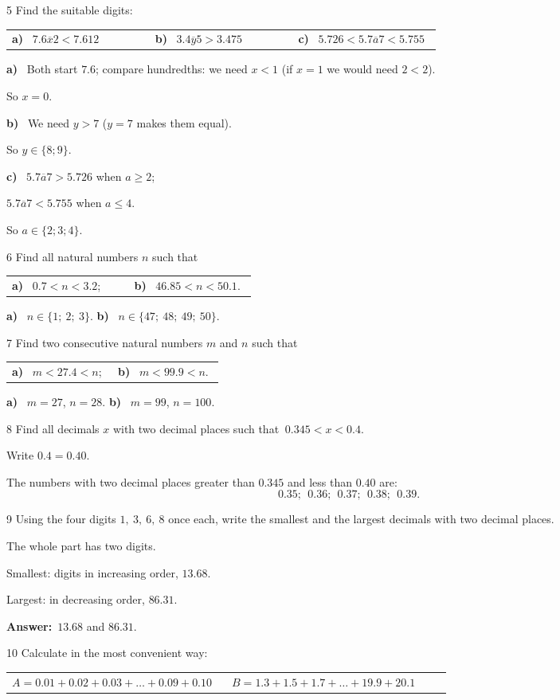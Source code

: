 \documentclass[11pt]{article}
\makeatletter
\newif\ifsol \solfalse
\renewcommand{\arraystretch}{1.35}
\providecommand{\AnsWord}{Đáp số}
\newcommand{\dapso}[1]{\par\textbf{\AnsWord:}\ #1}
\newcommand{\probsol}[1]{%
  \begin{lrbox}{\solmeasure}\begin{minipage}{\dimexpr\linewidth-24pt\relax}#1\end{minipage}\end{lrbox}%
  \ifsol
    \begin{solbox}#1\end{solbox}%
  \else
    \setlength{\solht}{\dimexpr\ht\solmeasure+\dp\solmeasure+0.85cm\relax}%
    \ifdim\solht<1.35cm\setlength{\solht}{1.35cm}\fi
    \begin{tcolorbox}[colback=white,colframe=Line,boxrule=0.8pt,arc=5pt,
      left=8pt,right=8pt,top=4pt,bottom=4pt,height=\solht]{\footnotesize\color{Slate}\itshape\WorkWord}\end{tcolorbox}%
  \fi}
\newcommand{\nd}[1]{\overline{#1}}
\newcommand{\pa}[1]{\textbf{#1)}\ }
\newenvironment{cols2}{\par\vspace{3pt}\noindent\setlength{\tabcolsep}{0pt}\renewcommand{\arraystretch}{1.3}%
  \begin{tabular}{@{}>{\raggedright\arraybackslash\rule{0pt}{4.4ex}}p{0.48\linewidth}<{\rule[-2.3ex]{0pt}{0pt}}@{\hspace{0.03\linewidth}}>{\raggedright\arraybackslash\rule{0pt}{4.4ex}}p{0.48\linewidth}<{\rule[-2.3ex]{0pt}{0pt}}@{}}}%
  {\end{tabular}\par}
\newenvironment{cols3}{\par\vspace{3pt}\noindent\setlength{\tabcolsep}{0pt}\renewcommand{\arraystretch}{1.3}%
  \begin{tabular}{@{}>{\raggedright\arraybackslash\rule{0pt}{4.4ex}}p{0.32\linewidth}<{\rule[-2.3ex]{0pt}{0pt}}@{\hspace{0.015\linewidth}}>{\raggedright\arraybackslash\rule{0pt}{4.4ex}}p{0.32\linewidth}<{\rule[-2.3ex]{0pt}{0pt}}@{\hspace{0.015\linewidth}}>{\raggedright\arraybackslash\rule{0pt}{4.4ex}}p{0.32\linewidth}<{\rule[-2.3ex]{0pt}{0pt}}@{}}}%
  {\end{tabular}\par}
\newcommand{\gap}{\vspace{0.3cm}}
\def\WorkWord{Your work:}
\def\AnsWord{Answer}
\makeatother
\begin{document}
\gap
\begin{probbox}{5}{\relax}
Find the suitable digits:
\begin{cols3}
\pa{a} $7.6\nd{x}2<7.612$ & \pa{b} $3.4\nd{y}5>3.475$ & \pa{c} $5.726<5.7\nd{a}7<5.755$
\end{cols3}
\end{probbox}
\probsol{
\pa{a} Both start $7.6$; compare hundredths: we need $x<1$ (if $x=1$ we would need $2<2$).\par So $x=0$.\par
\pa{b} We need $y>7$ ($y=7$ makes them equal).\par So $y\in\{8;9\}$.\par
\pa{c} $5.7\nd{a}7>5.726$ when $a\ge2$;\par $5.7\nd{a}7<5.755$ when $a\le4$.\par So $a\in\{2;3;4\}$.
}
\gap
\begin{probbox}{6}{\relax}
Find all natural numbers $n$ such that
\begin{cols2}
\pa{a} $0.7<n<3.2$; & \pa{b} $46.85<n<50.1$.
\end{cols2}
\end{probbox}
\probsol{
\pa{a} $n\in\{1;\ 2;\ 3\}$. \qquad \pa{b} $n\in\{47;\ 48;\ 49;\ 50\}$.
}
\gap
\begin{probbox}{7}{\relax}
Find two consecutive natural numbers $m$ and $n$ such that
\begin{cols2}
\pa{a} $m<27.4<n$; & \pa{b} $m<99.9<n$.
\end{cols2}
\end{probbox}
\probsol{
\pa{a} $m=27$, $n=28$. \qquad \pa{b} $m=99$, $n=100$.
}
\gap
\begin{probbox}{8}{\relax}
Find all decimals $x$ with two decimal places such that $\ 0.345<x<0.4$.
\end{probbox}
\probsol{
Write $0.4=0.40$.\par The numbers with two decimal places greater than $0.345$ and less than $0.40$ are:
\[0.35;\ \ 0.36;\ \ 0.37;\ \ 0.38;\ \ 0.39.\]
}
\gap
\begin{probbox}{9}{\relax}
Using the four digits $1,\ 3,\ 6,\ 8$ once each, write the smallest and the largest decimals with two decimal places.
\end{probbox}
\probsol{
The whole part has two digits.\par Smallest: digits in increasing order, $13.68$.\par Largest: in decreasing order, $86.31$.
\dapso{$13.68$ and $86.31$.}}
\gap
\begin{probbox}{10}{\relax}
Calculate in the most convenient way:
\begin{cols2}
$A=0.01+0.02+0.03+\dots+0.09+0.10$ & $B=1.3+1.5+1.7+\dots+19.9+20.1$
\end{cols2}
\end{probbox}
\end{document}
